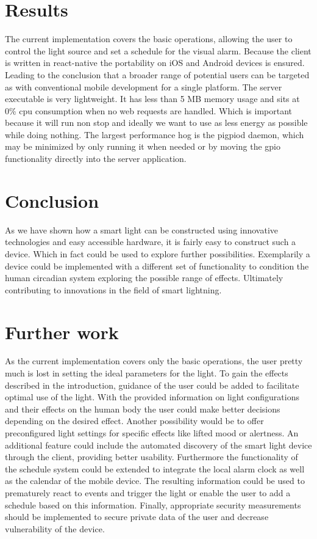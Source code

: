 \documentclass[conference]{IEEEtran}
\begin{document}
\section{Results}
The current implementation covers the basic operations, allowing the user to control the light source and set a schedule
for the visual alarm.
Because the client is written in react-native the portability on iOS and Android devices is ensured. Leading to the conclusion
that a broader range of potential users can be targeted as with conventional mobile development for a single platform.
The server executable is very lightweight. It has less than 5 MB memory usage and sits at 0\% cpu consumption when no web
requests are handled. Which is important because it will run non stop and ideally we want to use as less energy as possible while
doing nothing. The largest performance hog is the pigpiod daemon, which may be minimized by only running it when needed or by moving
the gpio functionality directly into the server application.


\section{Conclusion}
As we have shown how a smart light can be constructed using innovative technologies and easy accessible hardware, it is fairly
easy to construct such a device. Which in fact could be used to explore further possibilities. Exemplarily a device could be
implemented with a different set of functionality to condition the human circadian system exploring the possible range of effects.
Ultimately contributing to innovations in the field of smart lightning.


\section{Further work}
As the current implementation covers only the basic operations, the user pretty much is lost in setting the ideal parameters
for the light.
To gain the effects described in the introduction, guidance of the user could be added to facilitate
optimal use of the light. With the provided information on light configurations and their effects on the human body
the user could make better decisions depending on the desired effect. Another possibility would be to offer preconfigured
light settings for specific effects like lifted mood or alertness.
An additional feature could include the automated discovery of the smart light device through the client, providing
better usability.
Furthermore the functionality of the schedule system could be extended to integrate the local alarm clock as well as the calendar
of the mobile device. The resulting information could be used to prematurely react to events and trigger the light or enable the user
to add a schedule based on this information.
Finally, appropriate security measurements should be implemented to secure private data of the user and decrease vulnerability of the device.



\end{document}
